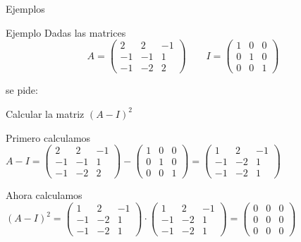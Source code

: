 \documentclass[9pt]{beamer}
\begin{document}
\begin{frame}{Ejemplos}

\begin{exampleblock}{Ejemplo}
Dadas las matrices 
\[A=\begin{pmatrix}
	2&2&-1 \\
	-1&-1&1 \\
	-1&-2&2
\end{pmatrix}
\qquad
I=\begin{pmatrix}
	1&0&0 \\
	0&1&0 \\
	0&0&1
\end{pmatrix} \]

se pide:

 Calcular la matriz $(A-I)^2$
\end{exampleblock}

\pause
 Primero calculamos $A-I=\begin{pmatrix}
	2&2&-1 \\
	-1&-1&1 \\
	-1&-2&2
\end{pmatrix}
-\begin{pmatrix}
	1&0&0 \\
	0&1&0 \\
	0&0&1
\end{pmatrix}=
\begin{pmatrix}
	1 & 2 & -1 \\
	-1&-2&1 		\\
	-1&-2 & 1
\end{pmatrix} $ 

\pause
Ahora calculamos $(A-I)^2=\begin{pmatrix}
	1 & 2 & -1 \\
	-1&-2&1 		\\
	-1&-2 & 1
\end{pmatrix} \cdot\begin{pmatrix}
	1 & 2 & -1 \\
	-1&-2&1 		\\
	-1&-2 & 1
\end{pmatrix} =
\begin{pmatrix}
	0 & 0 & 0 \\
	0&0&0 		\\
	0&0 & 0
\end{pmatrix} $


\end{frame}
\end{document}

